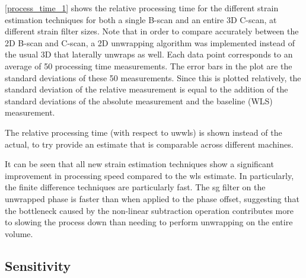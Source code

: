 \autoref{process_time_1} shows the relative processing time for the different strain estimation techniques for both a single B-scan and an entire 3D C-scan, at different strain filter sizes. Note that in order to compare accurately between the 2D B-scan and C-scan, a 2D unwrapping algorithm was implemented instead of the usual 3D that laterally unwraps as well. Each data point corresponds to an average of 50 processing time measurements. The error bars in the plot are the standard deviations of these 50 measurements. Since this is plotted relatively, the standard deviation of the relative measurement is equal to the addition of the standard deviations of the absolute measurement and the baseline (WLS) measurement.

The relative processing time (with respect to \ac{uwwls}) is shown instead of the actual, to try provide an estimate that is comparable across different machines.

It can be seen that all new strain estimation techniques show a significant improvement in processing speed compared to the \ac{wls} estimate. In particularly, the finite difference techniques are particularly fast. The \ac{sg} filter on the unwrapped phase is faster than when applied to the phase offset, suggesting that the bottleneck caused by the non-linear subtraction operation contributes more to slowing the process down than needing to perform unwrapping on the entire volume. 

\subsection{Sensitivity}

